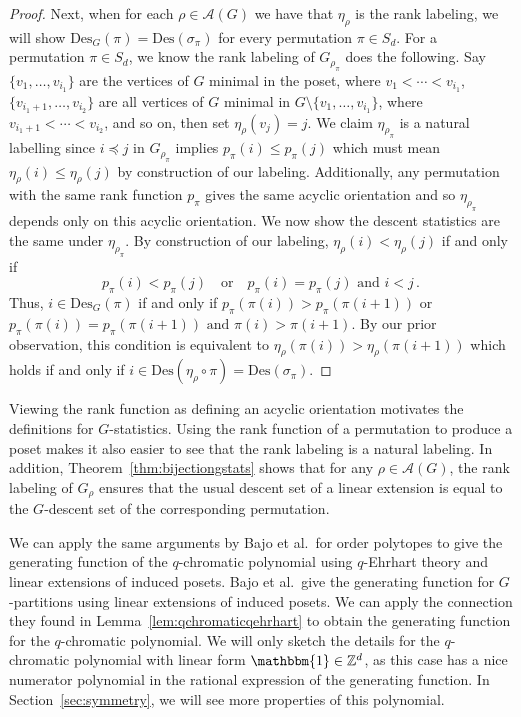 \documentclass[11pt]{amsart}
\newcommand{\rk}[1][\pi]{p_{#1}}
\newcommand{\des}{\mathrm{Des}}
\newcommand{\acyclic}[1]{\mathcal{A}(#1)}
\begin{document}
\begin{proof}
    Next, when for each $\rho \in \acyclic{G}$ we have that $\eta_\rho$ is the rank labeling, we will show $\des_G(\pi) = \des(\sigma_\pi)$ for every permutation $\pi \in S_d$. 
    For a permutation $\pi \in S_d$, we know the rank labeling of $G_{\rho_\pi}$ does the following. 
    Say $\{v_1, \ldots, v_{i_1}\}$ are the vertices of $G$ minimal in the poset, where $v_1< \cdots < v_{i_1}$,
    $\{v_{i_1 + 1}, \ldots, v_{i_2}\}$ are all vertices of $G$ minimal in $G\setminus\{v_1, \ldots, v_{i_1}\}$, where $v_{i_1 + 1} < \cdots < v_{i_2}$, and so on, then set $\eta_\rho(v_j) = j$. 
    We claim $\eta_{\rho_\pi}$ is a natural labelling since $i \preceq j$ in $G_{\rho_\pi}$ implies $\rk(i) \leq \rk(j)$ which must mean $\eta_\rho(i) \leq \eta_\rho(j)$ by construction of our labeling. 
    Additionally, any permutation with the same rank function $\rk$ gives the same acyclic orientation and so $\eta_{\rho_\pi}$ depends only on this acyclic orientation.
    We now show the descent statistics are the same under $\eta_{\rho_\pi}$. 
    By construction of our labeling, $\eta_\rho(i) < \eta_\rho(j)$  if and only if
    \[
        \rk(i) < \rk(j) \quad \text{or} \quad \rk(i) = \rk(j) \text{ and } i < j \, .
    \]
    Thus, $i \in \des_G(\pi)$ if and only if $\rk(\pi(i)) > \rk(\pi(i+1))$ or $\rk(\pi(i)) = \rk(\pi(i+1)) \text{ and } \pi(i) > \pi(i+1)$. 
    By our prior observation, this condition is equivalent to $\eta_\rho(\pi(i)) > \eta_\rho(\pi(i+1))$ which holds if and only if $i \in \des( \eta_\rho \circ \pi) = \des(\sigma_\pi)$.
\end{proof}
 
Viewing the rank function as defining an acyclic orientation motivates the definitions for $G$-statistics. 
Using the rank function of a permutation to produce a poset makes it also easier to see that the rank labeling is a natural labeling. 
In addition, Theorem~\ref{thm:bijectiongstats} shows that for any $\rho \in \acyclic{G}$, the rank labeling of $G_\rho$ ensures that the usual descent set of a linear extension is equal to the $G$-descent set of the corresponding permutation. 

We can apply the same arguments by Bajo et al.\ for order polytopes to give the generating function of the $q$-chromatic polynomial using $q$-Ehrhart theory and linear extensions of induced posets.
Bajo et al.\ give the generating function for $G$-partitions using linear extensions of induced posets.
We can apply the connection they found in Lemma~\ref{lem:qchromaticqehrhart} to obtain the generating function for the $q$-chromatic polynomial.
We will only sketch the details for the $q$-chromatic polynomial with linear form $\mathbbm{1} \in \mathbb{Z}^d$, as this case has a nice numerator polynomial in the rational expression of the generating function.
In Section~\ref{sec:symmetry}, we will see more properties of this polynomial.
\end{document}
